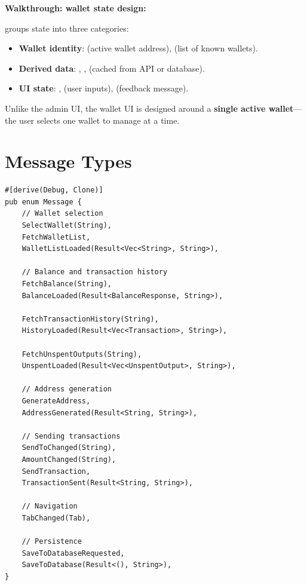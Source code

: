 \textbf{Walkthrough: wallet state design:}

 groups state into three categories:

\begin{itemize}
  \item \textbf{Wallet identity}:  (active wallet address),  (list of known wallets).
  \item \textbf{Derived data}: , ,  (cached from API or database).
  \item \textbf{UI state}: ,  (user inputs),  (feedback message).
\end{itemize}

Unlike the admin UI, the wallet UI is designed around a \textbf{single active wallet}---the user selects one wallet to manage at a time.

\section{Message Types}
\label{sec:ch18-messages}

\begin{listing}[H]
\caption{Message enum (excerpt) ()}
\label{lst:ch18-messages}
\begin{verbatim}
#[derive(Debug, Clone)]
pub enum Message {
    // Wallet selection
    SelectWallet(String),
    FetchWalletList,
    WalletListLoaded(Result<Vec<String>, String>),

    // Balance and transaction history
    FetchBalance(String),
    BalanceLoaded(Result<BalanceResponse, String>),

    FetchTransactionHistory(String),
    HistoryLoaded(Result<Vec<Transaction>, String>),

    FetchUnspentOutputs(String),
    UnspentLoaded(Result<Vec<UnspentOutput>, String>),

    // Address generation
    GenerateAddress,
    AddressGenerated(Result<String, String>),

    // Sending transactions
    SendToChanged(String),
    AmountChanged(String),
    SendTransaction,
    TransactionSent(Result<String, String>),

    // Navigation
    TabChanged(Tab),

    // Persistence
    SaveToDatabaseRequested,
    SaveToDatabase(Result<(), String>),
}
\end{verbatim}
\end{listing}

